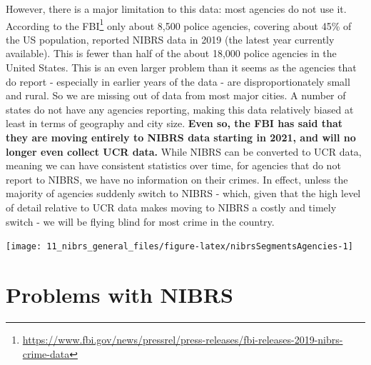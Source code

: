 \documentclass[
]{krantz}
\let\origfigure\figure
\let\endorigfigure\endfigure
\renewenvironment{figure}[1][2] {
    \expandafter\origfigure\expandafter[H]
} {
    \endorigfigure
}
\renewcommand{\href}[2]{#2\footnote{\url{#1}}}
\begin{document}
However, there is a major limitation to this data: most
agencies do not use it.
\href{https://www.fbi.gov/news/pressrel/press-releases/fbi-releases-2019-nibrs-crime-data}{According
to the FBI} only about 8,500 police agencies, covering about
45\% of the US population, reported NIBRS data in 2019 (the
latest year currently available). This is fewer than half of
the about 18,000 police agencies in the United States. This
is an even larger problem than it seems as the agencies that
do report - especially in earlier years of the data - are
disproportionately small and rural. So we are missing out of
data from most major cities. A number of states do not have
any agencies reporting, making this data relatively biased
at least in terms of geography and city size. \textbf{Even
so, the FBI has said that they are moving entirely to NIBRS
data starting in 2021, and will no longer even collect UCR
data.} While NIBRS can be converted to UCR data, meaning we
can have consistent statistics over time, for agencies that
do not report to NIBRS, we have no information on their
crimes. In effect, unless the majority of agencies suddenly
switch to NIBRS - which, given that the high level of detail
relative to UCR data makes moving to NIBRS a costly and
timely switch - we will be flying blind for most crime in
the country.

\begin{figure}

{\centering \texttt{[image: 11\_nibrs\_general\_files/figure-latex/nibrsSegmentsAgencies-1]} 

}

\caption{The number of agencies reporting data for each of the NIBRS Segments, 1991-2022.}\label{fig:nibrsSegmentsAgencies}
\end{figure}

\section{Problems with NIBRS}\label{problems-with-nibrs}
\end{document}
